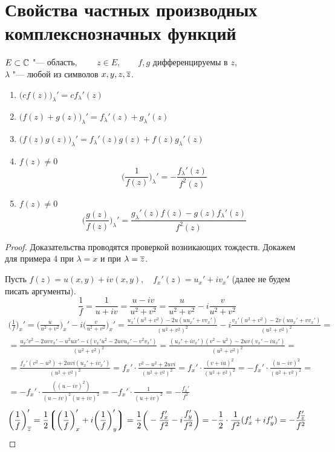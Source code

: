 \section{Свойства частных производных комплекснозначных функций}

\begin{properties}
	$ E \subset \mathbb{C} $ "--- область, $ \qquad z \in E, \qquad f, g $ дифференцируемы в $ z $, \\
	$ \lambda $ "--- любой из символов $ x, y, z, \overline z $.
	\begin{enumerate}
		\item $ \bigg( cf(z) \bigg)_\lambda' = cf_\lambda'(z) $
		\item $ \bigg( f(z) + g(z) \bigg)_\lambda' = f_\lambda'(z) + g_\lambda'(z) $
		\item $ \bigg( f(z)g(z) \bigg)_\lambda' = f_\lambda'(z)g(z) + f(z)g_\lambda'(z) $
		\item $ f(z) \ne 0 $
		$$ \bigg( \frac1{f(z)} \bigg)_\lambda' = -\frac{f_\lambda'(z)}{f^2(z)} $$
		\item $ f(z) \ne 0 $
		$$ \bigg( \frac{g(z)}{f(z)} \bigg)_\lambda' = \frac{g_\lambda'(z)f(z) - g(z)f_\lambda'(z)}{f^2(z)} $$
	\end{enumerate}
\end{properties}

\begin{proof}
	Доказательства проводятся проверкой возникающих тождеств. Докажем для примера 4 при $ \lambda = x $ и при $ \lambda = \overline z $.

	Пусть $ f(z) = u(x, y) + iv(x, y), \quad f_x'(z) = u_x' + iv_x' $ (далее не будем писать аргументы).
	$$ \frac1f = \frac1{u + iv} = \frac{u - iv}{u^2 + v^2} = \frac u{u^2 + v^2} - i \frac v{u^2 + v^2} $$
	\begin{multline*}
		\bigg( \frac1f \bigg)_x' = \bigg( \frac u{u^2 + v^2} \bigg)_x' - i \bigg( \frac v{u^2 + v^2} \bigg)_x' = \frac{u_x'(u^2 + v^2) - 2u(uu_x' + vv_x')}{(u^2 + v^2)^2} - i \frac{v_x'(u^2 + v^2) - 2v(uu_x' + vv_x')}{(u^2 + v^2)^2} = \\
		= \frac{u_x'v^2 - 2uvv_x' - u^2ux' - i(v_x'u^2 - 2uvu_x' - v^2v_x')}{(u^2 + v^2)^2} = \frac{(u_x' + iv_x')(v^2 - u^2) - 2uv(v_x' - iu_x')}{(u^2 + v^2)^2} = \\
		= \frac{f_x'(v^2 - u^2) + 2uvi(u_x' + iv_x')}{(u^2 + v^2)^2} = f_x' \cdot \frac{v^2 - u^2 + 2uvi}{(u^2 + v^2)^2} = f_x' \cdot \frac{(v + iu)^2}{(u^2 + v^2)^2} = -f_x' \cdot \frac{(u - iv)^2}{(u^2 + v^2)^2} = \\
		= -f_x' \cdot \frac{((u - iv)^2)}{(u - iv)^2(u + iv)^2} = -f_x' \cdot \frac1{(u + iv)^2} = -\frac{f_x'}{f^2}
	\end{multline*}
	$$ \bigg( \frac1f \bigg)_{\overline z}' = \frac12 \bigg\lgroup \bigg( \frac1f \bigg)_x' + i \bigg( \frac1f \bigg)_y' \bigg\rgroup = \frac12 \bigg( -\frac{f_x'}{f^2} - i \frac{f_y'}{f^2} \bigg) = -\frac12 \cdot \frac1{f^2} (f_x' + if_y') = -\frac{f_{\overline z}'}{f^2} $$
\end{proof}

